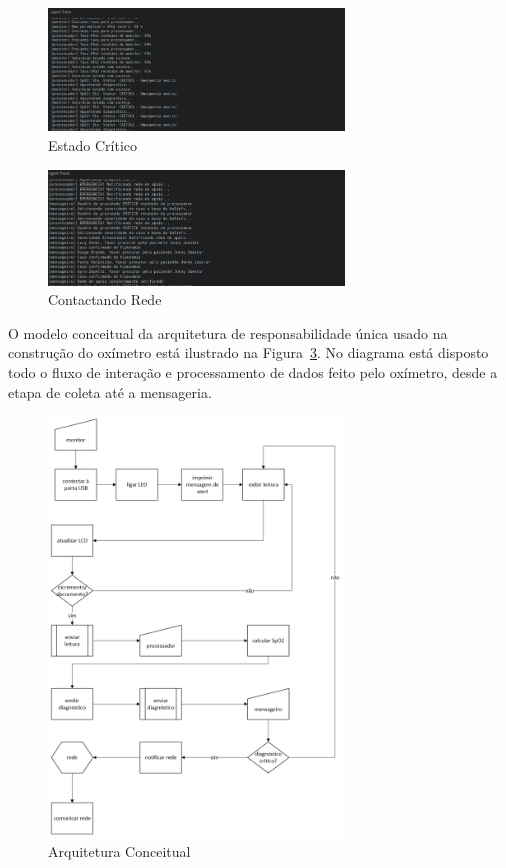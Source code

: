 \begin{figure}[H]
  \centering
  \includegraphics[width=0.7\textwidth]{assets/img/perception.emergency.png}
  \caption{Estado Crítico}
  \label{fig:fig2}
\end{figure}


\begin{figure}[H]
  \centering
  \includegraphics[width=0.7\textwidth]{assets/img/netwokcall.png}
  \caption{Contactando Rede}
  \label{fig:fig3}
\end{figure}

O modelo conceitual da arquitetura de responsabilidade única usado na construção do oxímetro está ilustrado na Figura~\ref{fig:fig4}. 
No diagrama está disposto todo o fluxo de interação e processamento de dados feito pelo oxímetro, desde a etapa de coleta até a mensageria.

\begin{figure}[H]
  \centering
  \includegraphics[width=0.7\textwidth]{assets/img/diagrama.png}
  \caption{Arquitetura Conceitual}
  \label{fig:fig4}
\end{figure}